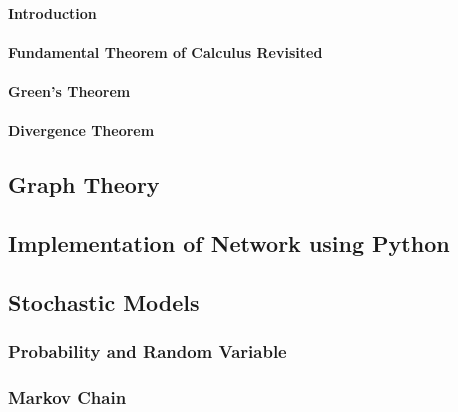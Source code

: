 \paragraph{Introduction} 

\paragraph{Fundamental Theorem of Calculus Revisited}

\paragraph{Green's Theorem} 

\paragraph{Divergence Theorem} 


\subsection{Graph Theory} 



\subsection{Implementation of Network using Python}

\subsection{Stochastic Models} 

\subsubsection{Probability and Random Variable} 

\subsubsection{Markov Chain} 







